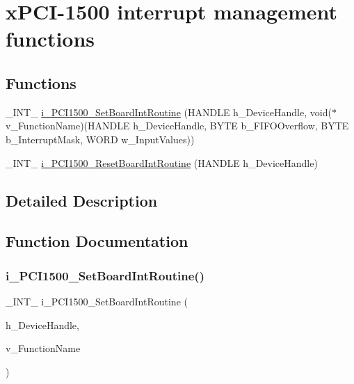 \hypertarget{group___interrupt}{}\section{x\+P\+C\+I-\/1500 interrupt management functions}
\label{group___interrupt}
\subsection*{Functions}
\begin{DoxyCompactItemize}
\item 
\+\_\+\+I\+N\+T\+\_\+ \mbox{\hyperlink{group___interrupt_gacd05556a284d0340634d05597efc6ea8}{i\+\_\+\+P\+C\+I1500\+\_\+\+Set\+Board\+Int\+Routine}} (H\+A\+N\+D\+LE h\+\_\+\+Device\+Handle, void($\ast$v\+\_\+\+Function\+Name)(H\+A\+N\+D\+LE h\+\_\+\+Device\+Handle, B\+Y\+TE b\+\_\+\+F\+I\+F\+O\+Overflow, B\+Y\+TE b\+\_\+\+Interrupt\+Mask, W\+O\+RD w\+\_\+\+Input\+Values))
\item 
\+\_\+\+I\+N\+T\+\_\+ \mbox{\hyperlink{group___interrupt_gaaa6708d373bb256b37c0c4cd42953ee6}{i\+\_\+\+P\+C\+I1500\+\_\+\+Reset\+Board\+Int\+Routine}} (H\+A\+N\+D\+LE h\+\_\+\+Device\+Handle)
\end{DoxyCompactItemize}


\subsection{Detailed Description}


\subsection{Function Documentation}
\mbox{\label{group___interrupt_gacd05556a284d0340634d05597efc6ea8}} 
\subsubsection{\texorpdfstring{i\_PCI1500\_SetBoardIntRoutine()}{i\_PCI1500\_SetBoardIntRoutine()}}
{\footnotesize\ttfamily \+\_\+\+I\+N\+T\+\_\+ i\+\_\+\+P\+C\+I1500\+\_\+\+Set\+Board\+Int\+Routine (\begin{DoxyParamCaption}\item[{H\+A\+N\+D\+LE}]{h\+\_\+\+Device\+Handle,  }\item[{void($\ast$)(H\+A\+N\+D\+LE h\+\_\+\+Device\+Handle, B\+Y\+TE b\+\_\+\+F\+I\+F\+O\+Overflow, B\+Y\+TE b\+\_\+\+Interrupt\+Mask, W\+O\+RD w\+\_\+\+Input\+Values)}]{v\+\_\+\+Function\+Name }\end{DoxyParamCaption})}

